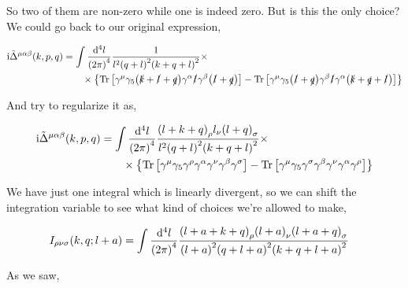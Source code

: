 So two of them are non-zero while one is indeed zero. But is this the only choice? We could go back to our original 
expression,

\begin{align}
    \textnormal{i}{\tilde\Delta}^{\mu\alpha\beta}\qty(k,p,q)&=
    \int\frac{\dd[4]{l}}{\qty(2\pi)^4}\frac{1}{l^2\qty(q+l)^2\qty(k+q+l)^2}\times\nonumber\\
    &\quad\quad\times\qty{
    \Tr\qty[\gamma^\mu\gamma_5\qty(\slashed {k}+\slashed{l}+\slashed q)\gamma^\alpha\slashed {l}\gamma^\beta \qty(\slashed {l}+\slashed q)]
    -\Tr\qty[\gamma^\mu\gamma_5\qty(\slashed {l}+\slashed q)\gamma^\beta\slashed {l}\gamma^\alpha \qty(\slashed {k}+\slashed{q}+\slashed l)]}\nonumber
\end{align}

And try to regularize it as,

\begin{align}
    \textnormal{i}{\tilde\Delta}^{\mu\alpha\beta}\qty(k,p,q)&=
    \int\frac{\dd[4]{l}}{\qty(2\pi)^4}\frac{\qty(l+k+q)_\rho l_\nu \qty(l+q)_\sigma}{l^2\qty(q+l)^2\qty(k+q+l)^2}\times\nonumber\\
    &\quad\quad\times\qty{
    \Tr\qty[\gamma^\mu\gamma_5\gamma^\rho\gamma^\alpha\gamma^\nu\gamma^\beta\gamma^\sigma]
    -\Tr\qty[\gamma^\mu\gamma_5\gamma^\sigma\gamma^\beta\gamma^\nu\gamma^\alpha\gamma^\rho]}\nonumber
\end{align}

We have just one integral which is linearly divergent, so we can shift the integration variable to see what 
kind of choices we're allowed to make,

\begin{align}
    I_{\rho\nu\sigma}\qty(k,q;l+a)&=\int\frac{\dd[4]{l}}{\qty(2\pi)^4}\frac{\qty(l+a+k+q)_\rho \qty(l+a)_\nu \qty(l+a+q)_\sigma}{\qty(l+a)^2\qty(q+l+a)^2\qty(k+q+l+a)^2}\nonumber
\end{align}

As we saw,

